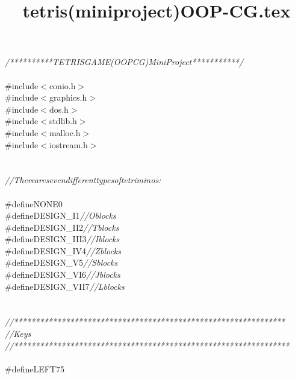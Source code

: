 \documentclass[a4paper, 10pt]{article}
\title{tetris(miniproject)OOP-CG.tex}
\newcommand\SPC{\hspace*{0.6em}}
\newcommand\HYP{\mbox{\char 45}}
\newcommand{\CppAComment}[1]{\textit{\textcolor[rgb]{0.2,0.6,1}{#1}}}
\newcommand{\CppAPreprocessor}[1]{\textcolor[rgb]{0,0.5,0}{#1}}
\begin{document}
\begin{ttfamily}
\noindent
\CppAComment{/**********\SPC TETRIS\SPC GAME(OOP\HYP CG)\SPC MiniProject***********/}\\
\\
\CppAPreprocessor{\#include\SPC $<$conio.h$>$}\\
\CppAPreprocessor{\#include\SPC $<$graphics.h$>$}\\
\CppAPreprocessor{\#include\SPC $<$dos.h$>$}\\
\CppAPreprocessor{\#include\SPC $<$stdlib.h$>$}\\
\CppAPreprocessor{\#include\SPC $<$malloc.h$>$}\\
\CppAPreprocessor{\#include\SPC $<$iostream.h$>$}\\
\\
\\
\CppAComment{//\SPC There\SPC are\SPC seven\SPC different\SPC types\SPC of\SPC tetriminos\SPC :}\\
\\
\CppAPreprocessor{\#define\SPC NONE\SPC 0}\\
\CppAPreprocessor{\#define\SPC DESIGN\_I\SPC 1\SPC }\CppAComment{//\SPC O\SPC blocks}\\
\CppAPreprocessor{\#define\SPC DESIGN\_II\SPC 2\SPC }\CppAComment{//\SPC T\SPC blocks}\\
\CppAPreprocessor{\#define\SPC DESIGN\_III\SPC 3\SPC }\CppAComment{//\SPC I\SPC blocks}\\
\CppAPreprocessor{\#define\SPC DESIGN\_IV\SPC 4\SPC }\CppAComment{//\SPC Z\SPC blocks}\\
\CppAPreprocessor{\#define\SPC DESIGN\_V\SPC 5\SPC }\CppAComment{//\SPC S\SPC blocks}\\
\CppAPreprocessor{\#define\SPC DESIGN\_VI\SPC 6\SPC }\CppAComment{//\SPC J\SPC blocks}\\
\CppAPreprocessor{\#define\SPC DESIGN\_VII\SPC 7\SPC }\CppAComment{//\SPC L\SPC blocks}\\
\\
\\
\CppAComment{//***************************************************************}\\
\CppAComment{//\SPC \SPC \SPC \SPC \SPC \SPC \SPC \SPC \SPC \SPC \SPC \SPC \SPC \SPC \SPC \SPC \SPC \SPC \SPC Keys}\\
\CppAComment{//****************************************************************}\\
\\
\CppAPreprocessor{\#define\SPC LEFT\SPC 75}\\

\end{ttfamily}
\end{document}
